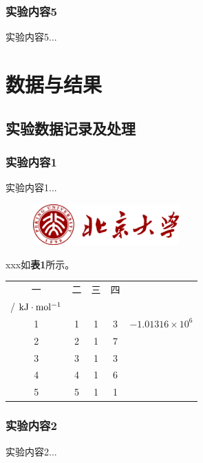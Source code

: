 \documentclass[12pt]{article}
\begin{document}
			\subsubsection{实验内容5}
				实验内容5...
    	
	\vbox{}  
	
	 \section{数据与结果}
 		\subsection{实验数据记录及处理}
 			\subsubsection{实验内容1}
 				实验内容1...
		 		 \begin{figure}[h]
		 			\centering
		 			\includegraphics[width=0.5\textwidth]{pku.png}
		 		\end{figure}
		 	
		 		xxx如\textbf{表1}所示。
		 		
		 		  \begin{table}[h]
		 			\centering
		 			\begin{tabular}{ccccc} 
		 				\toprule
		 				一 & 二 & 三 & 四 & \thead[c] {$E_{trans}$ \\ / $ \rm kJ \cdot mol^{-1} $} \\
		 				\midrule
		 				1 & 1 & 1 & 3 & $-1.01316\times10^{6}$ \\
		 				2 & 2 & 1 & 7 & \\
		 				3 & 3 & 1 & 3 & \\
		 				4 & 4 & 1 & 6 & \\
		 				5 & 5 & 1 & 1 & \\
		 				\bottomrule
		 			\end{tabular}
		 		\end{table}
		 		\vbox{}
 	
	 		\subsubsection{实验内容2}
	 			实验内容2...
\end{document}
